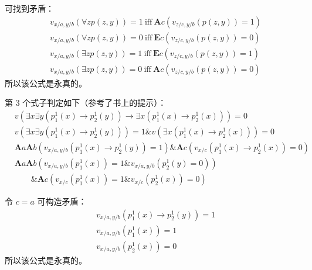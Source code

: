 \documentclass[UTF8]{ctexart}
\begin{document}
    可找到矛盾：
    \begin{align*}
        & v_{x/a,y/b}(\forall z p(z, y)) = 1 \ \mathrm{iff}\ \mathbf{A}c(v_{z/c, y/b}(p(z, y)) = 1) \\
        & v_{x/a,y/b}(\forall z p(z, y)) = 0 \ \mathrm{iff}\ \mathbf{E}c(v_{z/c, y/b}(p(z, y)) = 0) \\
        & v_{x/a,y/b}(\exists z p(z, y)) = 1 \ \mathrm{iff}\ \mathbf{E}c(v_{z/c, y/b}(p(z, y)) = 1) \\
        & v_{x/a,y/b}(\exists z p(z, y)) = 0 \ \mathrm{iff}\ \mathbf{A}c(v_{z/c, y/b}(p(z, y)) = 0)
    \end{align*}
    所以该公式是永真的。

    第 $3$ 个式子判定如下（参考了书上的提示）：
    \begin{align*}
        & v(\exists x \exists y (p_1^1(x) \to p_2^1(y)) \to \exists x (p_1^1(x) \to p_2^1(x))) = 0 \\
        & v(\exists x \exists y (p_1^1(x) \to p_2^1(y))) = 1 \& v(\exists x(p_1^1(x) \to p_2^1(x))) = 0 \\
        & \mathbf{A}a\mathbf{A}b(v_{x/a,y/b}( p_1^1(x) \to p_2^1(y)) = 1) \& \mathbf{A}c(v_{x/c}(p_1^1(x) \to p_2^1(x)) = 0) \\
        & \mathbf{A}a\mathbf{A}b(v_{x/a,y/b}(p_1^1(x))=1 \& v_{x/a,y/b}(p_2^1(y)=0)) \\
        & \qquad \& \mathbf{A}c(v_{x/c}(p_1^1(x))=1 \& v_{x/c}(p_2^1(x))=0)
    \end{align*}

    令 $c=a$ 可构造矛盾：
    \begin{align*}
        & v_{x/a, y/b}(p_1^1(x) \to p_2^1(y))=1 \\
        & v_{x/a, y/b}(p_1^1(x))=1 \\
        & v_{x/a, y/b}(p_2^1(x))=0
    \end{align*}
    所以该公式是永真的。
\end{document}
